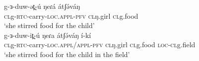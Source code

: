 \ex \gll	g-ɜ-duw-ət̪-ú 			ŋeɾá 		átʃə́váŋ\\
		\textsc{cl}g-\textsc{rtc}-carry-\textsc{loc.appl-\textsc{pfv}}	\textsc{cl}ŋ.girl		\textsc{cl}g.food	\\ 
		\glt ‘she stirred food for the child’ \\

\ex	\gll g-ɜ-duw-it̪-ú 			ŋeɾa 		átʃə́váŋ 		í-kí\\
	\textsc{cl}g-\textsc{rtc}-carry-\textsc{loc.appl/appl-\textsc{pfv}}	\textsc{cl}ŋ.girl		\textsc{cl}g.food	\textsc{loc-cl}g.field	\\
		\glt ‘she stirred food for the child in the field’ \\
\z
\z

%
%
%
%

%
%

